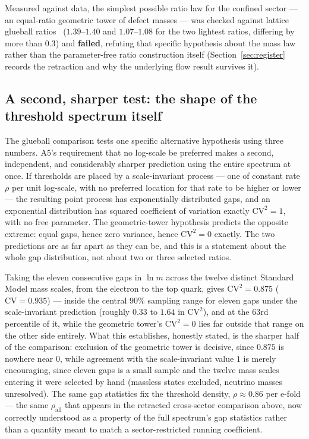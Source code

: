 \documentclass[pdflatex,sn-mathphys-num]{sn-jnl}
\theoremstyle{thmstyleone}
\theoremstyle{thmstylethree}
\theoremstyle{thmstyletwo}
\begin{document}
Measured against data, the simplest possible ratio law for the confined
sector — an equal-ratio geometric tower of defect masses — was checked
against lattice glueball ratios~\cite{MorningstarPeardon1999} ($1.39$–$1.40$ and $1.07$–$1.08$ for the
two lightest ratios, differing by more than $0.3$) and
\textbf{failed}, refuting that specific hypothesis about the mass law
rather than the parameter-free ratio construction itself
(Section~\ref{sec:register} records the retraction and why the
underlying flow result survives it).

\subsection{A second, sharper test: the shape of the threshold spectrum itself}

The glueball comparison tests one specific alternative hypothesis using
three numbers. A5's requirement that no log-scale be preferred makes a
second, independent, and considerably sharper prediction using the
entire spectrum at once. If thresholds are placed by a scale-invariant
process — one of constant rate $\rho$ per unit log-scale, with no
preferred location for that rate to be higher or lower — the resulting
point process has exponentially distributed gaps, and an exponential
distribution has squared coefficient of variation exactly
$\mathrm{CV}^2=1$, with no free parameter. The geometric-tower hypothesis
predicts the opposite extreme: equal gaps, hence zero variance, hence
$\mathrm{CV}^2=0$ exactly. The two predictions are as far apart as they
can be, and this is a statement about the whole gap distribution, not
about two or three selected ratios.

Taking the eleven consecutive gaps in $\ln m$ across the twelve distinct
Standard Model mass scales, from the electron to the top quark, gives
$\mathrm{CV}^2=0.875$ ($\mathrm{CV}=0.935$) — inside the central $90\%$
sampling range for eleven gaps under the scale-invariant prediction
(roughly $0.33$ to $1.64$ in $\mathrm{CV}^2$), and at the $63$rd
percentile of it, while the geometric tower's $\mathrm{CV}^2=0$ lies far
outside that range on the other side entirely. What this establishes,
honestly stated, is the sharper half of the comparison: exclusion of the
geometric tower is decisive, since $0.875$ is nowhere near $0$, while
agreement with the scale-invariant value $1$ is merely encouraging,
since eleven gaps is a small sample and the twelve mass scales entering
it were selected by hand (massless states excluded, neutrino masses
unresolved). The same gap statistics fix the threshold density,
$\rho\approx0.86$ per e-fold — the same $\rho_{\text{all}}$ that appears
in the retracted cross-sector comparison above, now correctly understood
as a property of the full spectrum's gap statistics rather than a
quantity meant to match a sector-restricted running coefficient.
\end{document}
